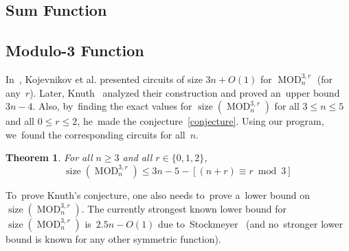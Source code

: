 \documentclass[12pt,letterpaper]{article}
\newtheorem{theorem}{Theorem}
\DeclareMathOperator{\MOD}{MOD}
\DeclareMathOperator{\size}{size}
\begin{document}
\subsection{Sum Function}

\subsection{Modulo-3 Function}
In~\cite{DBLP:conf/sat/KojevnikovKY09}, Kojevnikov et al. 
presented circuits of size $3n+O(1)$ for $\MOD_n^{3,r}$ (for any~$r$). Later, 
Knuth~\cite[solution to exercise~$480$]{Knuth:2015:ACP:2898950} analyzed their construction and proved an~upper 
bound $3n-4$. Also, by~finding the exact values 
for $\size(\MOD_n^{3,r})$ for all $3 \le n \le 5$ and all $0 \le r \le 2$, he~made the conjecture~\eqref{conjecture}.
Using our program, we~found the corresponding circuits for all~$n$.

\begin{theorem}\label{theorem:mod3upper}
For all $n \ge 3$ and all $r \in \{0,1,2\}$,
\[\size(\MOD_n^{3,r}) \le 3n-5-[(n+r) \equiv r\bmod 3] \, \]
\end{theorem}

To~prove Knuth's conjecture, one also needs to~prove a~lower bound on $\size(\MOD_n^{3,r})$. The currently strongest known lower bound for $\size(\MOD_n^{3,r})$ 
is~$2.5n-O(1)$ due to~Stockmeyer~\cite{DBLP:journals/mst/Stockmeyer77} 
(and no~stronger lower bound is known for any other symmetric function).
\end{document}
